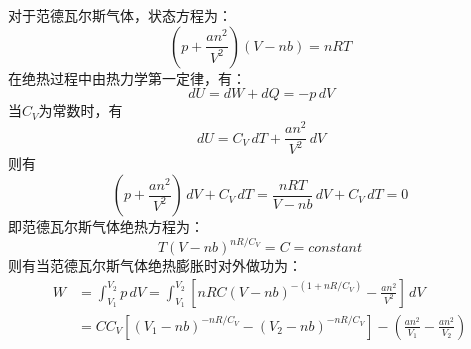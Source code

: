 \documentclass[a4paper,12pt]{article}
\begin{document}
\section{}
对于范德瓦尔斯气体，状态方程为：
\begin{equation}\nonumber
	\left(p+\frac{an^2}{V^2}\right)\left(V-nb\right)=nRT
\end{equation}
在绝热过程中由热力学第一定律，有：
\begin{equation}\nonumber
	\,dU=dW+dQ=-p\,dV
\end{equation}
当$C_V$为常数时，有
\begin{equation}\nonumber
	\,dU=C_V \,dT+\frac{an^2}{V^2}\,dV
\end{equation}
则有
\begin{equation}\nonumber
	\left(p+\frac{an^2}{V^2}\right)\,dV+C_V\,dT=\frac{nRT}{V-nb}\,dV+C_V\,dT=0
\end{equation}
即范德瓦尔斯气体绝热方程为：
\begin{equation}\nonumber
	T\left(V-nb\right)^{nR/C_V}=C=constant
\end{equation}
则有当范德瓦尔斯气体绝热膨胀时对外做功为：
\begin{equation}\nonumber
\begin{aligned}
	W&=\int_{V_1}^{V_2}p\,dV=\int_{V_1}^{V_2}\left[nRC\left(V-nb\right)^{-(1+nR/C_V)}-\frac{an^2}{V^2}\right]\,dV\\
	&=CC_V\left[\left(V_1-nb\right)^{-nR/C_V}-\left(V_2-nb\right)^{-nR/C_V}\right]-\left(\frac{an^2}{V_1}-\frac{an^2}{V_2}\right)
\end{aligned}
\end{equation}
\end{document}
